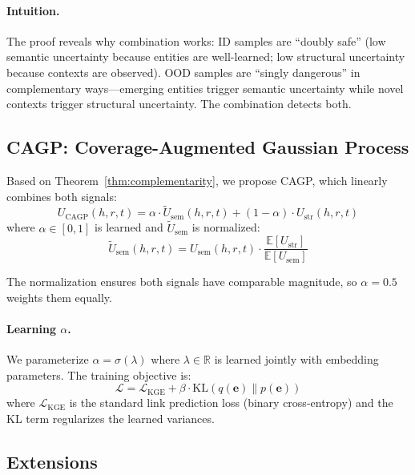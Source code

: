 \paragraph{Intuition.} The proof reveals why combination works: ID samples are ``doubly safe'' (low semantic uncertainty because entities are well-learned; low structural uncertainty because contexts are observed). OOD samples are ``singly dangerous'' in complementary ways---emerging entities trigger semantic uncertainty while novel contexts trigger structural uncertainty. The combination detects both.

\subsection{CAGP: Coverage-Augmented Gaussian Process}

Based on Theorem~\ref{thm:complementarity}, we propose CAGP, which linearly combines both signals:
\begin{equation}
    U_{\text{CAGP}}(h,r,t) = \alpha \cdot \tilde{U}_{\text{sem}}(h,r,t) + (1-\alpha) \cdot U_{\text{str}}(h,r,t)
\end{equation}
where $\alpha \in [0,1]$ is learned and $\tilde{U}_{\text{sem}}$ is normalized:
\begin{equation}
    \tilde{U}_{\text{sem}}(h,r,t) = U_{\text{sem}}(h,r,t) \cdot \frac{\mathbb{E}[U_{\text{str}}]}{\mathbb{E}[U_{\text{sem}}]}
\end{equation}

The normalization ensures both signals have comparable magnitude, so $\alpha = 0.5$ weights them equally.

\paragraph{Learning $\alpha$.} We parameterize $\alpha = \sigma(\lambda)$ where $\lambda \in \mathbb{R}$ is learned jointly with embedding parameters. The training objective is:
\begin{equation}
    \mathcal{L} = \mathcal{L}_{\text{KGE}} + \beta \cdot \text{KL}(q(\mathbf{e}) \| p(\mathbf{e}))
\end{equation}
where $\mathcal{L}_{\text{KGE}}$ is the standard link prediction loss (binary cross-entropy) and the KL term regularizes the learned variances.

\subsection{Extensions}

